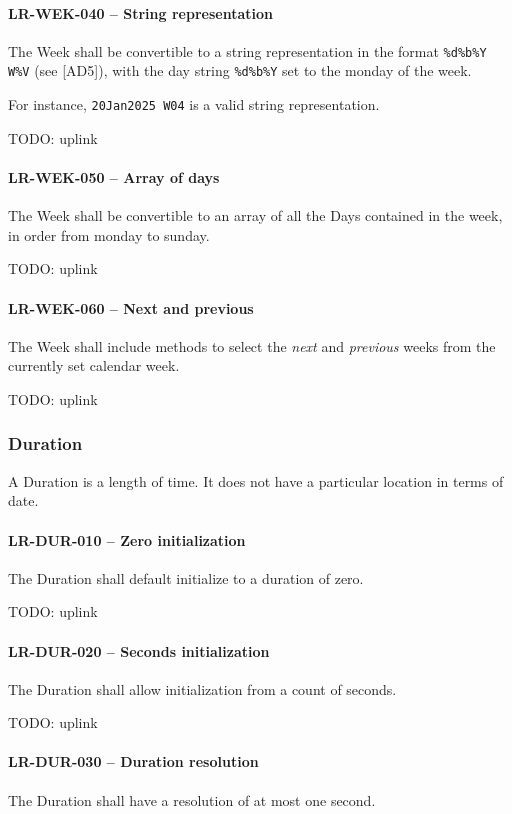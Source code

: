 \paragraph{LR-WEK-040 -- String representation}
The Week shall be convertible to a string representation in the format
\lstinline{%d%b%Y W%V} (see [AD5]), with the day string \lstinline{%d%b%Y}
set to the monday of the week.

For instance, \lstinline{20Jan2025 W04} is a valid string representation.

TODO: uplink

\paragraph{LR-WEK-050 -- Array of days}
The Week shall be convertible to an array of all the Days contained
in the week, in order from monday to sunday.

TODO: uplink
  
\paragraph{LR-WEK-060 -- Next and previous}
The Week shall include methods to select the \emph{next} and \emph{previous}
weeks from the currently set calendar week.

TODO: uplink

\subsubsection{Duration}
A Duration is a length of time. It does not have a particular location
in terms of date.

\paragraph{LR-DUR-010 -- Zero initialization}
The Duration shall default initialize to a duration of zero.

TODO: uplink
\paragraph{LR-DUR-020 -- Seconds initialization}
The Duration shall allow initialization from a count of seconds.

TODO: uplink
\paragraph{LR-DUR-030 -- Duration resolution}
The Duration shall have a resolution of at most one second.

